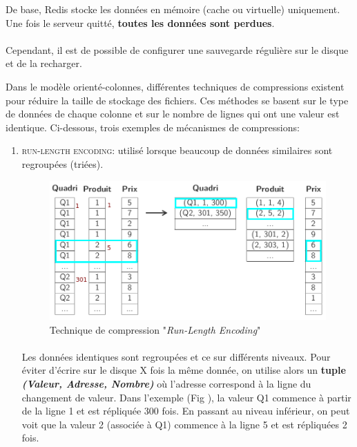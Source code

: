 \item{}
{\faux}
{
De base, Redis stocke les données en mémoire (cache ou virtuelle) uniquement. Une fois le serveur quitté, \textbf{toutes les données sont perdues}.
\paragraph{}
Cependant, il est de possible de configurer une sauvegarde régulière sur le disque et de la recharger.
}


\item{}
{\vrai}
{
Dans le modèle orienté-colonnes, différentes techniques de compressions existent pour réduire la taille de stockage des fichiers. Ces méthodes se basent sur le type de données de chaque colonne et sur le nombre de lignes qui ont une valeur est identique. Ci-dessous, trois exemples de mécanismes de compressions:
\begin{enumerate}\setlength{\itemsep}{.5em}
\item \textcolor{ltred}{\textsc{run-length encoding}}: utilisé lorsque beaucoup de données similaires sont regroupées (triées).
	\begin{figure}[h!]
	\center \includegraphics[scale=.35]{images/colonnes-compression-run}
	\caption{Technique de compression "\textit{Run-Length Encoding}" \cite{ref1}}\label{compression-run}
	\end{figure}
\paragraph{}
Les données identiques sont regroupées et ce sur différents niveaux. Pour éviter d'écrire sur le disque X fois la même donnée, on utilise alors un \textbf{tuple \textit{(Valeur, Adresse, Nombre)}} où l'adresse correspond à la ligne du changement de valeur. Dans l'exemple (Fig \cite{compression-run}), la valeur Q1 commence à partir de la ligne 1 et est répliquée 300 fois. En passant au niveau inférieur, on peut voit que la valeur 2 (associée à Q1) commence à la ligne 5 et est répliquées 2 fois. 

\end{enumerate}}

